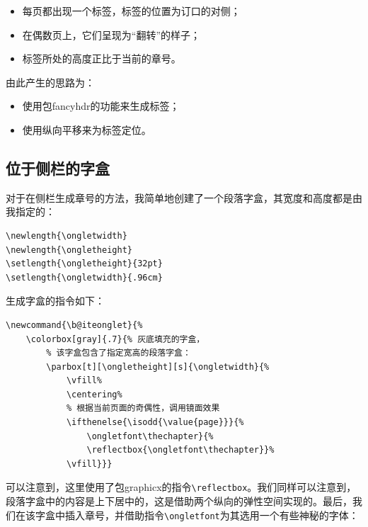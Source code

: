 \begin{itemize}
    \item 每页都出现一个标签，标签的位置为订口的对侧；
    \item 在偶数页上，它们呈现为“翻转”的样子；
    \item 标签所处的高度正比于当前的章号。
\end{itemize}

由此产生的思路为：

\begin{itemize}
    \item 使用包\textsf{fancyhdr}的功能来生成标签；
    \item 使用纵向平移来为标签定位。
\end{itemize}

\subsection{位于侧栏的字盒}

对于在侧栏生成章号的方法，我简单地创建了一个段落字盒，其宽度和高度都是由我指定的：

\begin{dmd}
\begin{verbatim}
\newlength{\ongletwidth}
\newlength{\ongletheight}
\setlength{\ongletheight}{32pt}
\setlength{\ongletwidth}{.96cm}\end{verbatim}
\end{dmd}

生成字盒的指令如下：

\begin{dmd}
\begin{verbatim}
\newcommand{\b@iteonglet}{%
    \colorbox[gray]{.7}{% 灰底填充的字盒，
        % 该字盒包含了指定宽高的段落字盒：
        \parbox[t][\ongletheight][s]{\ongletwidth}{%
            \vfill% 
            \centering%
            % 根据当前页面的奇偶性，调用镜面效果
            \ifthenelse{\isodd{\value{page}}}{%
                \ongletfont\thechapter}{%
                \reflectbox{\ongletfont\thechapter}}% 
            \vfill}}}\end{verbatim}
\end{dmd}

可以注意到，这里使用了包\textsf{graphicx}的指令\verb|\reflectbox|。我们同样可以注意到，段落字盒中的内容是上下居中的，这是借助两个纵向的弹性空间实现的。最后，我们在该字盒中插入章号，并借助指令\verb|\ongletfont|为其选用一个有些神秘的字体：

